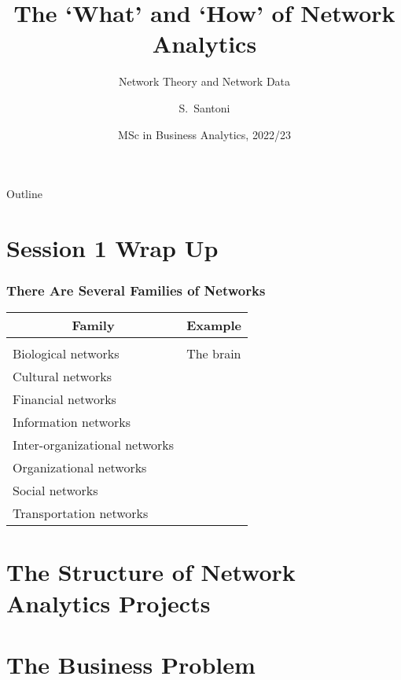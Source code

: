\documentclass[notes, aspectratio=1610]{beamer}
\title[Network Theory and Network Data]
{The `What' and `How' of Network Analytics}
\subtitle{Network Theory and Network Data}
\author{S.~Santoni\inst{1}\inst{2}}
\institute{
	\inst{1}%
	Bayes Business School
	\and
	\inst{2}%
	Soundcloud
	}
\date{MSc in Business Analytics, 2022/23}
\begin{document}
\begin{frame}
	\titlepage
\end{frame}

\begin{frame}{Outline}
	\tableofcontents
\end{frame}

\section{Session 1 Wrap Up}

\begin{frame}
	\frametitle{There Are Several Families of Networks}
	\begin{table}
		\begin{center}
			\begin{tabular}[c]{l|l}
				\hline \hline
				\multicolumn{1}{c|}{\textbf{Family}} & 
				\multicolumn{1}{c}{\textbf{Example}} \\
				\hline \\[-1.8ex]
				Biological networks & The brain\\
		                Cultural networks& \\
				Financial networks & \\
		                Information networks& \\
				Inter-organizational networks & \\
		                Organizational networks& \\
		                Social networks& \\
		                Transportation networks& \\				
				\hline
			\end{tabular}
		\end{center}
	\end{table}
\end{frame}

\section{The Structure of Network Analytics Projects}

\section{The Business Problem}
\end{document}
